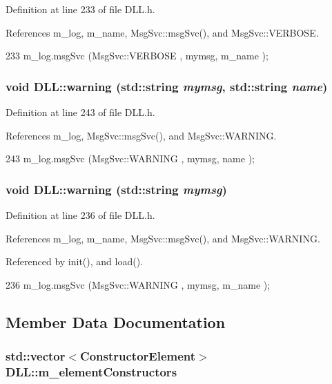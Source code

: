 Definition at line 233 of file DLL.h.

References m\_\-log, m\_\-name, MsgSvc::msgSvc(), and MsgSvc::VERBOSE.


\begin{DoxyCode}
233 { m_log.msgSvc (MsgSvc::VERBOSE , mymsg, m_name ); }
\end{DoxyCode}
\hypertarget{classDLL_a0f7d876098d5dcd412989a3b2a5dadf3}{
\subsubsection[{warning}]{\setlength{\rightskip}{0pt plus 5cm}void DLL::warning (std::string {\em mymsg}, \/  std::string {\em name})}}
\label{classDLL_a0f7d876098d5dcd412989a3b2a5dadf3}


Definition at line 243 of file DLL.h.

References m\_\-log, MsgSvc::msgSvc(), and MsgSvc::WARNING.


\begin{DoxyCode}
243 { m_log.msgSvc (MsgSvc::WARNING , mymsg, name ); }
\end{DoxyCode}
\hypertarget{classDLL_a4bbc341bad623eedb5c228c91ce2e858}{
\subsubsection[{warning}]{\setlength{\rightskip}{0pt plus 5cm}void DLL::warning (std::string {\em mymsg})}}
\label{classDLL_a4bbc341bad623eedb5c228c91ce2e858}


Definition at line 236 of file DLL.h.

References m\_\-log, m\_\-name, MsgSvc::msgSvc(), and MsgSvc::WARNING.

Referenced by init(), and load().


\begin{DoxyCode}
236 { m_log.msgSvc (MsgSvc::WARNING , mymsg, m_name ); }
\end{DoxyCode}


\subsection{Member Data Documentation}
\hypertarget{classDLL_a7ee65d305f4f6014f6499d69f162d024}{
\subsubsection[{m\_\-elementConstructors}]{\setlength{\rightskip}{0pt plus 5cm}std::vector$<${\bf ConstructorElement}$>$ {\bf DLL::m\_\-elementConstructors}}}
\label{classDLL_a7ee65d305f4f6014f6499d69f162d024}


